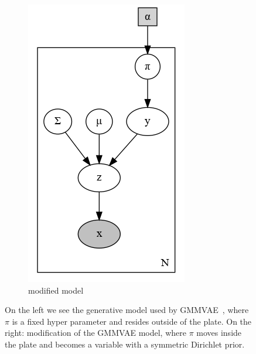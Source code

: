 \documentclass[11pt, a4paper]{report}
\theoremstyle{plain}
\theoremstyle{definition}
\theoremstyle{remark}
\begin{document}
\begin{figure}[!h]
\begin{framed}
\begin{subfigure}[b]{0.4\textwidth}
\includegraphics[width=\textwidth]{plots/mmpp.gv.png}
\caption{modified model}
\label{fig:mymix}
\end{subfigure}
\caption{
On the left we see the generative model used by
GMMVAE~\cite{dilokthanakul2016deep}, where $\pi$ is a fixed hyper parameter and resides
outside of the plate.
On the right: modification of the GMMVAE model, where $\pi$ moves inside the plate
and becomes a variable with a symmetric Dirichlet prior.}
\label{fig:mixturemodels2}
\end{framed}
\end{figure}
\end{document}
